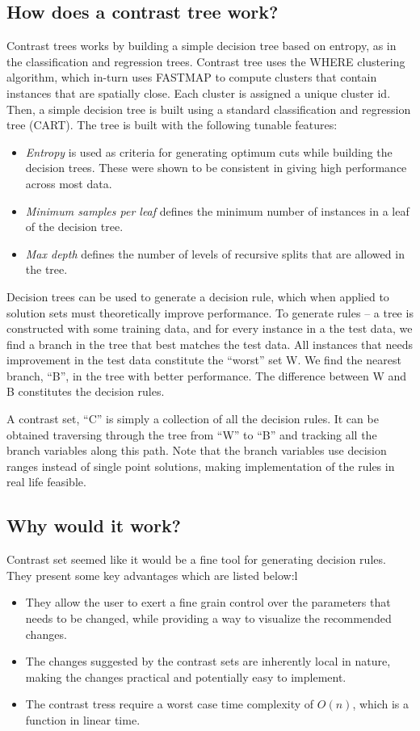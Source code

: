 \documentclass[conference]{IEEEtran}
\begin{document}
\subsection{How does a contrast tree work?}
Contrast trees works by building a simple decision tree based on entropy, as in the classification and regression trees. Contrast tree uses the WHERE clustering algorithm, which in-turn uses FASTMAP \cite{} to compute clusters 
that contain instances that are spatially close. Each cluster is assigned a unique cluster id. Then, a simple decision tree is built using a standard classification and regression tree (CART). The tree is built with the following tunable features:
\begin{itemize}
\item \textit{Entropy} is used as criteria for generating optimum cuts while building the decision trees. These were shown to be consistent in giving high performance across most data.
\item \textit{Minimum samples per leaf} defines the minimum number of instances in a leaf of the decision tree.
\item \textit{Max depth} defines the number of levels of recursive splits that are allowed in the tree.
\end{itemize}
Decision trees can be used to generate a decision rule, which when applied to solution sets must theoretically improve performance. To generate rules -- a tree is constructed with some training data, and for every instance in a the test data, we find a branch in the tree that best matches the test data. All instances that needs improvement in the test data constitute the ``worst'' set W. We find the nearest branch, ``B'', in the tree with better performance. The difference between W and B constitutes the decision rules.

A contrast set, ``C'' is simply a collection of all the decision rules. It can be obtained traversing through the tree from ``W'' to ``B'' and tracking all the branch variables along this path. Note that the branch variables use decision ranges instead of single point solutions, making implementation of the rules in real life feasible. 

\subsection{Why would it work?}
Contrast set seemed like it would be a fine tool for generating decision rules. They present some key advantages which are listed below:l
\begin{itemize}
\item They allow the user to exert a fine grain control over the parameters that needs to be changed, while providing a way to visualize the recommended changes.
\item The changes suggested by the contrast sets are inherently local in nature, making the changes practical and potentially easy to implement.
\item The contrast tress require a worst case time complexity of $O(n)$, which is a function in linear time.
\end{itemize}
\end{document}
